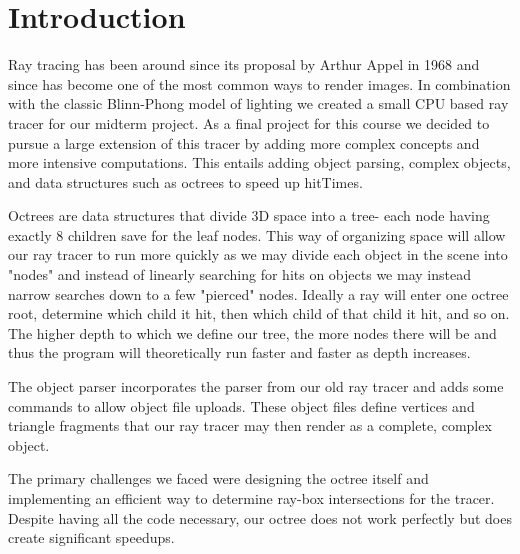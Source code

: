 \section{Introduction}

        \par Ray tracing has been around since its proposal by Arthur Appel in 1968 \cite{Appel} and since has become one of the most common ways to render images. In combination with the classic Blinn-Phong model of lighting we created a small CPU based ray tracer for our midterm project. As a final project for this course we decided to pursue a large extension of this tracer by adding more complex concepts and more intensive computations. This entails adding object parsing, complex objects, and data structures such as octrees to speed up hitTimes.
        \par Octrees are data structures that divide 3D space into a tree- each node having exactly 8 children save for the leaf nodes. This way of organizing space will allow our ray tracer to run more quickly as we may divide each object in the scene into "nodes" and instead of linearly searching for hits on objects we may instead narrow searches down to a few "pierced" nodes. Ideally a ray will enter one octree root, determine which child it hit, then which child of that child it hit, and so on. The higher depth to which we define our tree, the more nodes there will be and thus the program will theoretically run faster and faster as depth increases.
        \par The object parser incorporates the parser from our old ray tracer and adds some commands to allow object file uploads. These object files define vertices and triangle fragments that our ray tracer may then render as a complete, complex object.
        \par The primary challenges we faced were designing the octree itself and implementing an efficient way to determine ray-box intersections for the tracer. Despite having all the code necessary, our octree does not work perfectly but does create significant speedups. \cite{octree}
        
        
        
        
        
        
        
